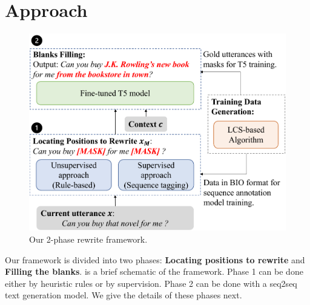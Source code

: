 \section{Approach}
\label{sec:2-step-supervised-method}

\begin{figure}[th]
        \centering
\includegraphics[width=\columnwidth]{fr1-crop.pdf}
        \caption{Our 2-phase rewrite framework.}
        \label{fig:framework}
\end{figure}

Our framework is divided into two phases: \textbf{Locating positions to rewrite} and 
\textbf{Filling the blanks}. 
 is a brief schematic of the framework.
Phase 1 can be done either by heuristic rules or by supervision. 
Phase 2 can be done with a seq2seq text generation model. 
We give the details of these phases next.


